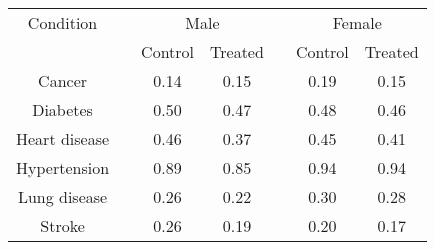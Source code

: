 \begin{tabular}{ccccccc}
\toprule
Condition && \multicolumn{2}{c}{Male} &  & \multicolumn{2}{c}{Female}\\
& & Control & Treated & & Control & Treated \\ \midrule
Cancer&&0.14&0.15&&0.19&0.15\\
Diabetes&&0.50&0.47&&0.48&0.46\\
Heart disease&&0.46&0.37&&0.45&0.41\\
Hypertension&&0.89&0.85&&0.94&0.94\\
Lung disease&&0.26&0.22&&0.30&0.28\\
Stroke&&0.26&0.19&&0.20&0.17\\
\bottomrule
\end{tabular}
